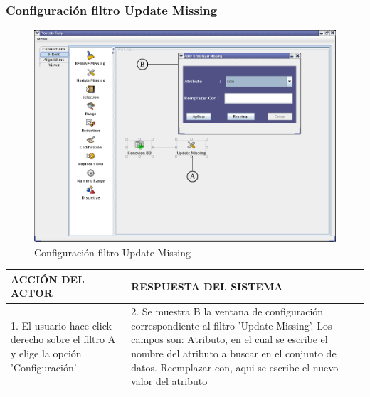 \newpage
\subsubsection{Configuraci\'on filtro Update Missing}
\begin{figure}[ht]
\centering
\includegraphics[width=1\textwidth]{images/fi2.png}
\caption{Configuraci\'on filtro Update Missing}
\end{figure}
\begin{center}
\begin{tabular}{|p{60mm}|p{60mm}|} \hline
ACCI\'ON DEL ACTOR & RESPUESTA DEL SISTEMA \\ \hline
1. El usuario hace click derecho sobre el filtro A y elige la opci\'on 'Configuraci\'on'& 2. Se muestra B la ventana de configuraci\'on correspondiente al filtro 'Update Missing'. Los campos son: Atributo, en el cual se escribe el nombre del atributo a buscar en el conjunto de datos. Reemplazar con, aqui se escribe el nuevo valor del atributo \\ \hline
\end{tabular}
\end{center}


\newpage

